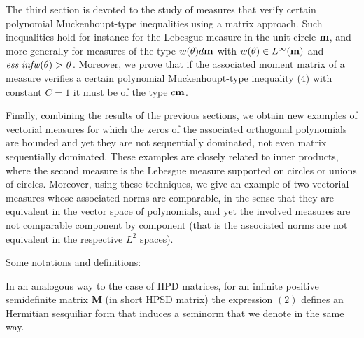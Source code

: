 \documentclass[12pt]{amsart}
\theoremstyle{definition}
\theoremstyle{plain}
\theoremstyle{remark}
\begin{document}
  \medskip
\noindent The third section is devoted to the study of measures that verify certain polynomial Muckenhoupt-type inequalities using a matrix approach. Such inequalities hold for instance for the Lebesgue measure in the unit circle ${\bf m}$, and more generally for measures of the type $w(\theta)d{\bf m}$ with $w(\theta)\in L^{\infty}({\bf m})$ and ${\it ess\; inf w(\theta)>0}$. Moreover, we prove that if the associated moment matrix of a measure verifies a certain polynomial Muckenhoupt-type inequality (4) with constant $C=1$ it must be of the type $c{\bf m}$. 

\medskip 

\noindent Finally, combining the results of the previous sections, we obtain new examples of vectorial measures for which the zeros of the associated orthogonal polynomials are bounded and yet they are not sequentially dominated,  not even matrix sequentially dominated. These examples are closely related to inner products, where the second measure is the Lebesgue measure supported on circles or unions of circles. Moreover, using these techniques, we give an example of two vectorial measures whose associated norms are comparable, in the sense that they are equivalent in the vector space of polynomials, and yet the involved measures are not comparable component by component (that is the associated norms are not equivalent in the respective $L^2$ spaces). 

\bigskip
\noindent Some notations and definitions: 

 \noindent  In an analogous way to the case of HPD matrices, for an infinite positive semidefinite matrix $\mathbf{M}$ (in short HPSD matrix) the expression $(2)$ defines an Hermitian sesquiliar form that induces a seminorm that we denote in the same way. 
 





 
 
\end{document}
